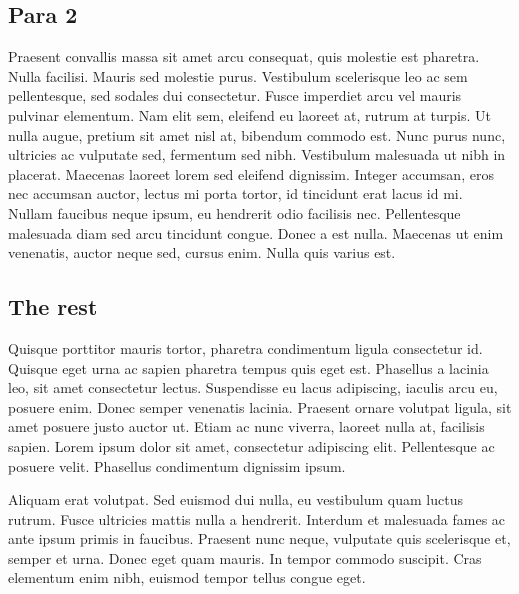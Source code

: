 \documentclass[a4paper]{article}
\begin{document}
\subsection{Para 2}
Praesent convallis massa sit amet arcu consequat, quis molestie est pharetra. Nulla facilisi. Mauris sed molestie purus. Vestibulum scelerisque leo ac sem pellentesque, sed sodales dui consectetur. Fusce imperdiet arcu vel mauris pulvinar elementum. Nam elit sem, eleifend eu laoreet at, rutrum at turpis. Ut nulla augue, pretium sit amet nisl at, bibendum commodo est. Nunc purus nunc, ultricies ac vulputate sed, fermentum sed nibh. Vestibulum malesuada ut nibh in placerat. Maecenas laoreet lorem sed eleifend dignissim. Integer accumsan, eros nec accumsan auctor, lectus mi porta tortor, id tincidunt erat lacus id mi. Nullam faucibus neque ipsum, eu hendrerit odio facilisis nec. Pellentesque malesuada diam sed arcu tincidunt congue. Donec a est nulla. Maecenas ut enim venenatis, auctor neque sed, cursus enim. Nulla quis varius est.
\subsection{The rest}
Quisque porttitor mauris tortor, pharetra condimentum ligula consectetur id. Quisque eget urna ac sapien pharetra tempus quis eget est. Phasellus a lacinia leo, sit amet consectetur lectus. Suspendisse eu lacus adipiscing, iaculis arcu eu, posuere enim. Donec semper venenatis lacinia. Praesent ornare volutpat ligula, sit amet posuere justo auctor ut. Etiam ac nunc viverra, laoreet nulla at, facilisis sapien. Lorem ipsum dolor sit amet, consectetur adipiscing elit. Pellentesque ac posuere velit. Phasellus condimentum dignissim ipsum.

Aliquam erat volutpat. Sed euismod dui nulla, eu vestibulum quam luctus rutrum. Fusce ultricies mattis nulla a hendrerit. Interdum et malesuada fames ac ante ipsum primis in faucibus. Praesent nunc neque, vulputate quis scelerisque et, semper et urna. Donec eget quam mauris. In tempor commodo suscipit. Cras elementum enim nibh, euismod tempor tellus congue eget. 
\end{document}
